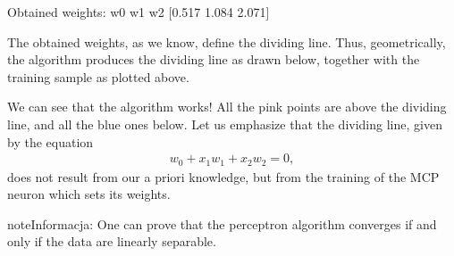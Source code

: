 \documentclass[a4paper,12pt,polish]{jupyterBook}
\begin{document}
\begin{sphinxVerbatimInput}
\begin{sphinxVerbatim}[commandchars=\\\{\}]
        
\PYG{p}{[}\PYG{p}{]}           
             
\end{sphinxVerbatim}
\end{sphinxVerbatimInput}
\begin{sphinxVerbatimOutput}

\begin{sphinxVerbatim}[commandchars=\\\{\}]
Obtained weights:
  w0     w1     w2
[\PYGZhy{}0.517 \PYGZhy{}1.084  2.071]
\end{sphinxVerbatim}
\end{sphinxVerbatimOutput}

\sphinxAtStartPar
The obtained weights, as we know, define the dividing line. Thus, geometrically, the algorithm produces the dividing line as drawn below, together with the training sample as plotted above.
\begin{sphinxVerbatimOutput}

\noindent{}
\end{sphinxVerbatimOutput}

\sphinxAtStartPar
We can see that the algorithm works! All the pink points are above the dividing line, and all the blue ones below. Let us emphasize that the dividing line, given by the equation
\begin{equation*}
\begin{split} w_0+x_1 w_1 + x_2 w_2=0,\end{split}
\end{equation*}
\sphinxAtStartPar
does not result from our a priori knowledge, but from the training of the MCP neuron which sets its weights.

\begin{sphinxadmonition}{note}{Informacja:}
\sphinxAtStartPar
One can prove that the perceptron algorithm converges if and only if the data are linearly separable.
\end{sphinxadmonition}
\end{document}
